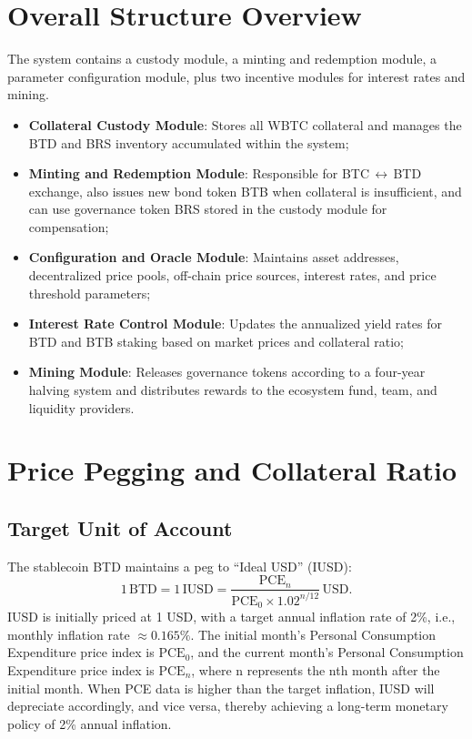 \documentclass{article}
\begin{document}
\section{Overall Structure Overview}
The system contains a custody module, a minting and redemption module, a parameter configuration module, plus two incentive modules for interest rates and mining.
\begin{itemize}
  \item \textbf{Collateral Custody Module}: Stores all WBTC collateral and manages the BTD and BRS inventory accumulated within the system;
  \item \textbf{Minting and Redemption Module}: Responsible for BTC\,$\leftrightarrow$\,BTD exchange, also issues new bond token BTB when collateral is insufficient, and can use governance token BRS stored in the custody module for compensation;
  \item \textbf{Configuration and Oracle Module}: Maintains asset addresses, decentralized price pools, off-chain price sources, interest rates, and price threshold parameters;
  \item \textbf{Interest Rate Control Module}: Updates the annualized yield rates for BTD and BTB staking based on market prices and collateral ratio;
  \item \textbf{Mining Module}: Releases governance tokens according to a four-year halving system and distributes rewards to the ecosystem fund, team, and liquidity providers.
\end{itemize}

\section{Price Pegging and Collateral Ratio}
\subsection{Target Unit of Account}
The stablecoin BTD maintains a peg to ``Ideal USD'' (IUSD):
\begin{equation}
1\,\text{BTD} = 1\,\text{IUSD}=\frac{\text{PCE}_n}{\text{PCE}_0\times1.02^{n/12}}\,\text{USD}.
\end{equation}
IUSD is initially priced at 1 USD, with a target annual inflation rate of 2\%, i.e., monthly inflation rate $\approx 0.165\%$. The initial month's Personal Consumption Expenditure price index is $\text{PCE}_0$, and the current month's Personal Consumption Expenditure price index is $\text{PCE}_n$, where n represents the nth month after the initial month. When PCE data is higher than the target inflation, IUSD will depreciate accordingly, and vice versa, thereby achieving a long-term monetary policy of 2\% annual inflation.
\end{document}
